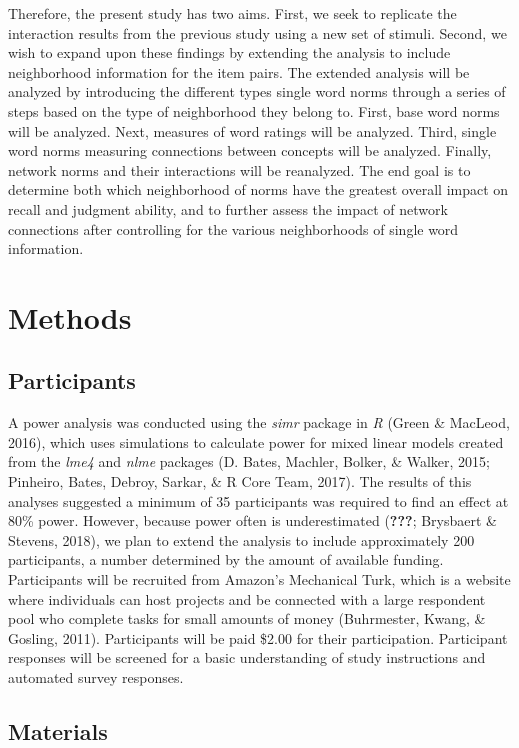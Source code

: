 \documentclass[english,man]{apa6}
\theoremstyle{definition}
\theoremstyle{definition}
\theoremstyle{definition}
\theoremstyle{remark}
\begin{document}
Therefore, the present study has two aims. First, we seek to replicate
the interaction results from the previous study using a new set of
stimuli. Second, we wish to expand upon these findings by extending the
analysis to include neighborhood information for the item pairs. The
extended analysis will be analyzed by introducing the different types
single word norms through a series of steps based on the type of
neighborhood they belong to. First, base word norms will be analyzed.
Next, measures of word ratings will be analyzed. Third, single word
norms measuring connections between concepts will be analyzed. Finally,
network norms and their interactions will be reanalyzed. The end goal is
to determine both which neighborhood of norms have the greatest overall
impact on recall and judgment ability, and to further assess the impact
of network connections after controlling for the various neighborhoods
of single word information.

\section{Methods}\label{methods}

\subsection{Participants}\label{participants}

A power analysis was conducted using the \emph{simr} package in \emph{R}
(Green \& MacLeod, 2016), which uses simulations to calculate power for
mixed linear models created from the \emph{lme4} and \emph{nlme}
packages (D. Bates, Machler, Bolker, \& Walker, 2015; Pinheiro, Bates,
Debroy, Sarkar, \& R Core Team, 2017). The results of this analyses
suggested a minimum of 35 participants was required to find an effect at
80\% power. However, because power often is underestimated
({\textbf{???}}; Brysbaert \& Stevens, 2018), we plan to extend the
analysis to include approximately 200 participants, a number determined
by the amount of available funding. Participants will be recruited from
Amazon's Mechanical Turk, which is a website where individuals can host
projects and be connected with a large respondent pool who complete
tasks for small amounts of money (Buhrmester, Kwang, \& Gosling, 2011).
Participants will be paid \$2.00 for their participation. Participant
responses will be screened for a basic understanding of study
instructions and automated survey responses.

\subsection{Materials}\label{materials}
\end{document}
